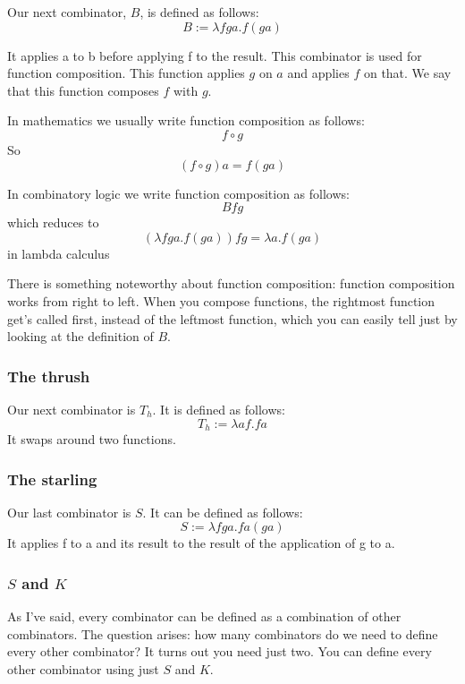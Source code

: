 \documentclass[11pt]{article}
\begin{document}
Our next combinator, \(B\), is defined as follows:
\[B:=\lambda fga.f(ga)\]

It applies a to b before applying f to the result. This combinator is used for
function composition. This function applies \(g\) on \(a\) and applies \(f\) on
that. We say that this function composes \(f\) with \(g\).

In mathematics we usually write function composition as follows:
\[f\circ g\]
So
\[(f\circ g)a=f(ga)\]

In combinatory logic we write function composition as follows:
\[Bfg\]
which reduces to
\[(\lambda fga.f(ga))fg=\lambda a.f(ga)\]
in lambda calculus

There is something noteworthy about function composition: function composition
works from right to left. When you compose functions, the rightmost function
get's called first, instead of the leftmost function, which you can easily tell
just by looking at the definition of \(B\).

\subsubsection{The thrush}\label{thrush}

Our next combinator is \(T_{h}\). It is defined as follows:
\[T_{h}:=\lambda af.fa\]
It swaps around two functions.

\subsubsection{The starling}

Our last combinator is \(S\). It can be defined as follows:
\[S:=\lambda fga.fa(ga)\]
It applies f to a and its result to the result of the application of g to a.

\subsubsection{\(S\) and \(K\)}


As I've said, every combinator can be defined as a combination of other
combinators. The question arises: how many combinators do we need to define
every other combinator? It turns out you need just two. You can define every
other combinator using just \(S\) and \(K\).

\end{document}
